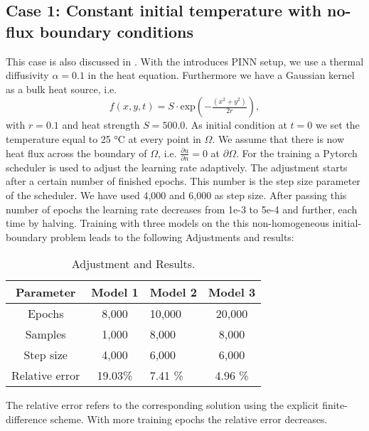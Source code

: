\documentclass[a4paper,11pt]{article}
\begin{document}
\subsection{Case 1: Constant initial temperature with no-flux boundary conditions}
This case is also discussed in \cite{aryal2024a}. With the introduces PINN setup, we use a thermal diffusivity $\alpha = 0.1 $ in the heat equation. Furthermore we have a Gaussian kernel as a bulk heat source, i.e.
\begin{equation*}
f(x,y,t) = S\cdot\mathrm{exp}\left(-\tfrac{(x^2+y^2)}{2r}\right),
\end{equation*}
with $r=0.1$ and heat strength $S=500.0 $. As initial condition at $t=0$ we set the temperature equal to 25 °C at every point in $\Omega $. We assume that there is now heat flux across the boundary of $\Omega $, i.e. $\tfrac{\partial u }{\partial n } = 0 $ at $\partial \Omega $. For the training a Pytorch scheduler is used to adjust the learning rate adaptively. The adjustment starts after a certain number of finished epochs. This number is the step size parameter of the scheduler. We have used 4,000 and 6,000 as step size. After passing this number of epochs the learning rate decreases from 1e-3 to 5e-4 and further, each time by halving. Training with three models on the this non-homogeneous initial-boundary problem leads to the following Adjustments and results:
\begin{table}[h!] 
\centering
{ \renewcommand{\arraystretch}{1.4}
\begin{tabular}{cclc}
\toprule
\textbf{Parameter} & \textbf{Model 1} & \textbf{Model 2}& \textbf{Model 3}\\
\midrule
Epochs & 8,000 & 10,000 & 20,000\\
Samples & 1,000 & 8,000 & 8,000 \\
Step size & 4,000 & 6,000 & 6,000 \\
Relative error & 19.03\% & 7.41 \% & 4.96 \% \\
\bottomrule
\end{tabular}}
\caption{Adjustment and Results.}
\label{AdjustmentAndResults1}
\end{table}
The relative error refers to the corresponding solution using the explicit finite-difference scheme. With more training epochs the relative error decreases.
\end{document}
